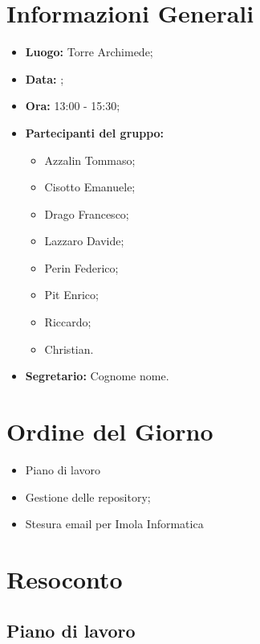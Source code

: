 \documentclass[a4paper, oneside, dvipsnames, table]{article}
\begin{document}
\copertina{}
\newpage



\clearpage
\tableofcontents
\clearpage

\section{Informazioni Generali}
\begin{itemize}
\item \textbf{Luogo:} Torre Archimede;
\item \textbf{Data:} \Data;
\item \textbf{Ora:} 13:00 - 15:30;
\item \textbf{Partecipanti del gruppo:}
	\begin{itemize}
	\item Azzalin Tommaso; 
	\item Cisotto Emanuele; 
	\item Drago Francesco;
	\item Lazzaro Davide;
	\item Perin Federico;
	\item Pit Enrico;
	\item Riccardo;
	\item Christian.
	\end{itemize} 
\item \textbf{Segretario:} Cognome nome.
\end{itemize}

\section{Ordine del Giorno}
\begin{itemize}
\item Piano di lavoro
\item Gestione delle repository;
\item Stesura email per Imola Informatica
\end{itemize}

\section{Resoconto}
\subsection{Piano di lavoro}
\end{document}
